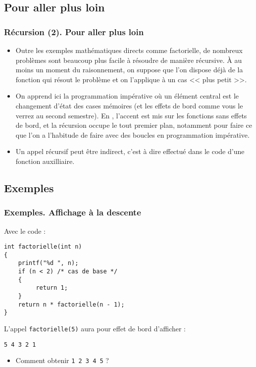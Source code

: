 \documentclass[xcolor=svgnames]{beamer}
\begin{document}
\subsection{Pour aller plus loin}
\begin{frame}[fragile]
  \frametitle{Récursion (2). Pour aller plus loin\nowrite}
  \begin{itemize}
  \item Outre les exemples mathématiques directs comme factorielle, de nombreux problèmes sont beaucoup plus facile à résoudre de manière récursive. À au moins un moment du raisonnement, on suppose que l'on dispose déjà de la fonction qui résout le problème et on l'applique à un cas << plus petit >>.\pause
  \item On apprend ici la programmation impérative où un élément central est le changement d'état des cases mémoires (et les effets de bord comme vous le verrez au second semestre). En , l'accent est mis sur les fonctions sans effets de bord, et la récursion occupe le tout premier plan, notamment pour faire ce que l'on a l'habitude de faire avec des boucles en programmation impérative.\pause
\item \alert{Un appel récursif peut être indirect}, c'est à dire effectué dans le code d'une fonction auxilliaire.
 \end{itemize}
\end{frame}

\subsection{Exemples}
\begin{frame}[fragile]
  \frametitle{Exemples. Affichage à la descente}
Avec le code  :
\begin{lstlisting}[basicstyle=\ttfamily\scriptsize] 
int factorielle(int n)
{
    printf("%d ", n);
    if (n < 2) /* cas de base */
    {
         return 1;
    } 
    return n * factorielle(n - 1); 
}
\end{lstlisting}
L'appel \verb+factorielle(5)+ aura pour effet de bord d'afficher :
\pause
\begin{verbatim}
5 4 3 2 1
\end{verbatim}
\pause
\begin{itemize}
\item  Comment obtenir \verb+1 2 3 4 5+ ?
\end{itemize}
\end{frame}
\end{document}
